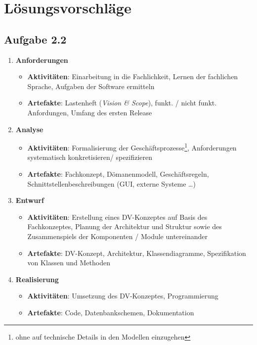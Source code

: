 \section{Lösungsvorschläge}

\subsection{Aufgabe 2.2}

\begin{enumerate}
    \item  \textbf{Anforderungen}
        \begin{itemize}
            \item \textbf{Aktivitäten}: Einarbeitung in die Fachlichkeit, Lernen der fachlichen Sprache, Aufgaben der Software ermitteln
            \item \textbf{Artefakte}: Lastenheft (\textit{Vision \& Scope}), funkt. / nicht funkt. Anfordungen, Umfang des ersten Release
        \end{itemize}

    \item  \textbf{Analyse}
    \begin{itemize}
        \item \textbf{Aktivitäten}: Formalisierung der Geschäftsprozesse\footnote{ohne auf technische Details in den Modellen einzugehen}, Anforderungen systematisch konkretisieren/ spezifizieren
        \item \textbf{Artefakte}: Fachkonzept, Dömanenmodell, Geschäftsregeln, Schnittstellenbeschreibungen (GUI, externe Systeme \ldots)
    \end{itemize}

    \item  \textbf{Entwurf}
    \begin{itemize}
        \item \textbf{Aktivitäten}: Erstellung eines DV-Konzeptes auf Basis des Fachkonzeptes, Planung der Architektur und Struktur sowie des Zusammenspiels der Komponenten / Module untereinander
        \item \textbf{Artefakte}: DV-Konzept, Architektur, Klassendiagramme, Spezifikation von Klassen und Methoden
    \end{itemize}

    \item  \textbf{Realisierung}
    \begin{itemize}
        \item \textbf{Aktivitäten}: Umsetzung des DV-Konzeptes, Programmierung
        \item \textbf{Artefakte}: Code, Datenbankschemen, Dokumentation
    \end{itemize}


\end{enumerate}
